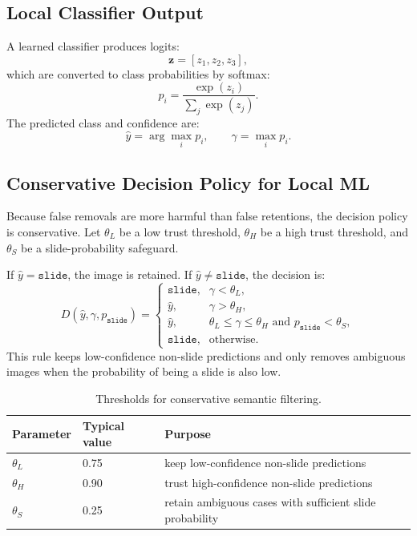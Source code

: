 \documentclass[11pt]{article}
\begin{document}
\subsection{Local Classifier Output}

A learned classifier produces logits:
\[
\mathbf{z} = [z_1,z_2,z_3],
\]
which are converted to class probabilities by softmax:
\[
p_i = \frac{\exp(z_i)}{\sum_j \exp(z_j)}.
\]
The predicted class and confidence are:
\[
\hat{y}=\arg\max_i p_i, \qquad
\gamma=\max_i p_i.
\]

\subsection{Conservative Decision Policy for Local ML}

Because false removals are more harmful than false retentions, the decision policy is conservative. Let $\theta_L$ be a low trust threshold, $\theta_H$ be a high trust threshold, and $\theta_S$ be a slide-probability safeguard.

If $\hat{y}=\texttt{slide}$, the image is retained. If $\hat{y}\neq\texttt{slide}$, the decision is:
\[
D(\hat{y},\gamma,p_{\texttt{slide}})=
\begin{cases}
\texttt{slide}, & \gamma < \theta_L,\\
\hat{y}, & \gamma > \theta_H,\\
\hat{y}, & \theta_L \le \gamma \le \theta_H
          \text{ and } p_{\texttt{slide}} < \theta_S,\\
\texttt{slide}, & \text{otherwise}.
\end{cases}
\]
This rule keeps low-confidence non-slide predictions and only removes ambiguous images when the probability of being a slide is also low.

\begin{table}[h]
\centering
\begin{tabular}{lll}
\toprule
Parameter & Typical value & Purpose \\
\midrule
$\theta_L$ & 0.75 & keep low-confidence non-slide predictions \\
$\theta_H$ & 0.90 & trust high-confidence non-slide predictions \\
$\theta_S$ & 0.25 & retain ambiguous cases with sufficient slide probability \\
\bottomrule
\end{tabular}
\caption{Thresholds for conservative semantic filtering.}
\end{table}
\end{document}
